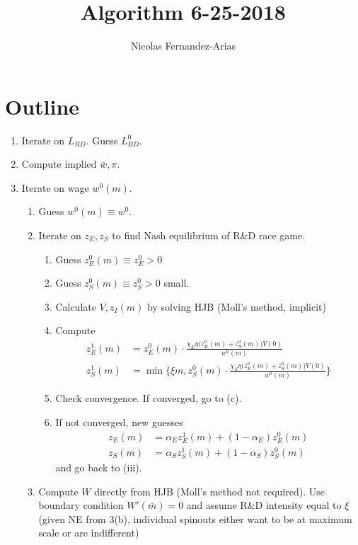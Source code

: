 \documentclass[12pt,english]{article}
\theoremstyle{remark}
\begin{document}
	
\title{Algorithm 6-25-2018}
\author{Nicolas Fernandez-Arias}
\maketitle

\section{Outline}

\begin{enumerate}
	\item Iterate on $L_{RD}$. Guess $L^0_{RD}$.  
	\item Compute implied $\bar{w},\pi$.
	\item Iterate on wage $w^0(m)$. 
	\begin{enumerate}
		\item Guess $w^0(m) \equiv w^0$.
		\item Iterate on $z_E,z_S$ to find Nash equilibrium of R\&D race game.
		\begin{enumerate}
			\item Guess $z_E^0(m) \equiv z_E^0 > 0$
			\item Guess $z_S^0(m) \equiv z_S^0 > 0$ small.
			\item Calculate $V,z_I(m)$ by solving HJB (Moll's method, implicit)
			\item Compute
			\begin{align*}
			z_E^1(m) &= z_E^0(m) \cdot \frac{\chi_E \eta \big(z_E^0(m) + z_S^0(m)\big)V(0)}{w^0(m)} \\
			z_S^1(m) &= \min\Bigg\{\xi m,z_S^0(m) \cdot \frac{\chi_S \eta \big(z_E^0(m) + z_S^0(m)\big)V(0)}{w^0(m)}\Bigg\}
			\end{align*}
			\item Check convergence. If converged, go to (c).
			\item If not converged, new guesses
			\begin{align*}
			z_E(m) &= \alpha_E z_E^1(m) + (1-\alpha_E) z_E^0(m) \\
			z_S(m) &= \alpha_S z_S^1(m) + (1-\alpha_S) z_S^0(m) 
			\end{align*}
			and go back to (iii). 
		\end{enumerate} 
		\item Compute $W$ directly from HJB (Moll's method not required). Use boundary condition $W'(\bar{m}) = 0$ and assume R\&D intensity equal to $\xi$ (given NE from 3(b), individual spinouts either want to be at maximum scale or are indifferent)

\end{enumerate}
\end{enumerate}
\end{document}
